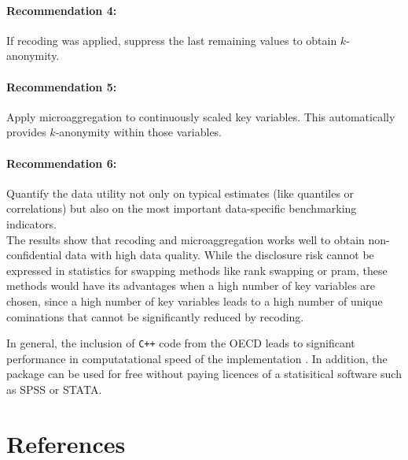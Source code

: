 \documentclass[12pt]{article}
\newcommand{\proglang}[1]{\textsf{#1}}
\begin{document}
\paragraph{Recommendation 4:} If recoding was applied, suppress the last remaining values to obtain $k$-anonymity.

\paragraph{Recommendation 5:} Apply microaggregation to continuously scaled key variables. This automatically provides $k$-anonymity within those variables.

\paragraph{Recommendation 6:} Quantify the data utility not only on typical estimates (like quantiles or correlations) but also on the most 
important data-specific benchmarking indicators. \\


The results show that recoding and microaggregation works well to obtain non-confidential data with high data quality. 
While the disclosure risk cannot be expressed in statistics for swapping methods like rank swapping or pram, these methods would have 
its advantages when a high number of key variables are chosen, since a high number of key variables leads to a high number of unique cominations that
cannot be significantly reduced by recoding. 

In general, the inclusion of \texttt{C++} code from the OECD leads to significant performance in computatational 
speed of the implementation 
\citep[see][]{Kowarik12del1}. In addition, the package can be used for free without paying 
licences of a statisitical software such as SPSS or STATA.


\section*{References}



\appendix 
\end{document}
